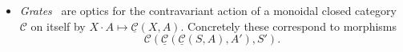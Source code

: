 \documentclass[11pt,letterpaper]{article}
\theoremstyle{plain}
\theoremstyle{definition}
\newtheorem{remark}[theorem]{Remark}
\newcommand{\C}{\mathscr{C}}
\newcommand{\homC}{\underline{\C}}
\newcommand{\Optic}{\mathbf{Optic}}
\newcommand{\act}{\cdot}
\newcommand{\hto}{\ensuremath{\,\mathaccent\shortmid\rightarrow\,}}
\newcommand{\todo}[1]{\textcolor{red}{\small #1}}
\begin{document}
\begin{itemize}

\item \emph{Grates}~\cite{GratesPost} are optics for the contravariant action of a monoidal closed category $\C$ on itself by $X \act A \mapsto \homC(X, A)$. Concretely these correspond to morphisms \[ \C(\homC(\homC(S, A), A'), S'). \]
\end{itemize}
\end{document}
